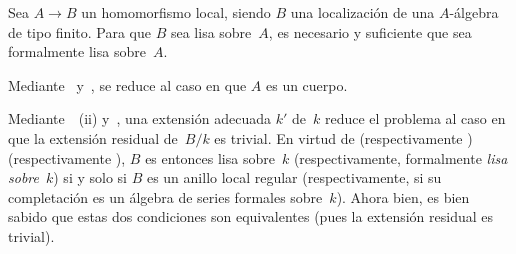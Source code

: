 \begin{proposition}
\label{III.1.9}
Sea $A\to B$ un homomorfismo local, siendo $B$ una localización de una $A$-álgebra de tipo finito. Para que $B$ sea lisa sobre~$A$, es necesario y suficiente que sea formalmente lisa sobre~$A$.
\end{proposition}

Mediante~ y~, se reduce al caso en que $A$ es un cuerpo.

Mediante~~(ii) y~, una extensión adecuada $k'$ de~$k$ reduce el problema al caso en que la extensión residual de~$B/k$ es trivial. En virtud de
{ (respectivamente )}
{ (respectivamente )},
$B$ es entonces lisa sobre~$k$ (respectivamente, formalmente \emph{lisa sobre}~$k$) si y solo si $B$ es un anillo local regular (respectivamente, si su completación es un álgebra de series formales sobre~$k$). Ahora bien, es bien sabido que estas dos condiciones son equivalentes (pues la extensión residual es trivial).
